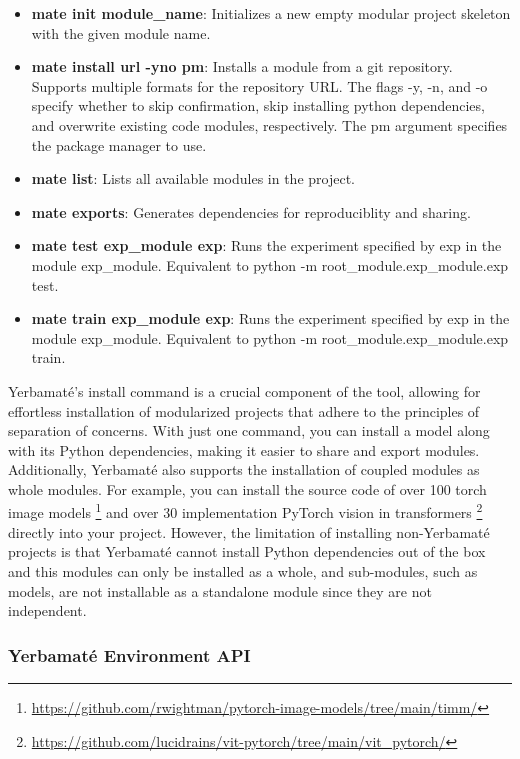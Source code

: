 \begin{itemize}
\item \textbf{mate init module\_name}: Initializes a new empty modular project skeleton with the given module name. 

\item \textbf{mate install url -y\textbar n\textbar o pm}: Installs a module from a git repository. Supports multiple formats for the repository URL. The flags -y, -n, and -o specify whether to skip confirmation, skip installing python dependencies, and overwrite existing code modules, respectively. The pm argument specifies the package manager to use.
\item \textbf{mate list}: Lists all available modules in the project. 
\item \textbf{mate exports}: Generates dependencies for reproduciblity and sharing.
\item \textbf{mate test exp\_module exp}: Runs the experiment specified by exp in the module exp\_module. Equivalent to python -m root\_module.exp\_module.exp test.
\item \textbf{mate train exp\_module exp}: Runs the experiment specified by exp in the module exp\_module. Equivalent to python -m root\_module.exp\_module.exp train.
\end{itemize}



Yerbamaté's install command is a crucial component of the tool, allowing for effortless installation of modularized projects that adhere to the principles of separation of concerns. With just one command, you can install a model along with its Python dependencies, making it easier to share and export modules. Additionally, Yerbamaté also supports the installation of coupled modules as whole modules. For example, you can install the source code of over 100 torch image models \footnote{\url{https://github.com/rwightman/pytorch-image-models/tree/main/timm/}} and over 30 implementation PyTorch vision in transformers \footnote{\url{https://github.com/lucidrains/vit-pytorch/tree/main/vit\_pytorch/}} directly into your project. However, the limitation of installing non-Yerbamaté projects is that Yerbamaté cannot install Python dependencies out of the box and this modules can only be installed as a whole, and sub-modules, such as models, are not installable as a standalone module since they are not independent.





\subsubsection{Yerbamaté Environment API}


